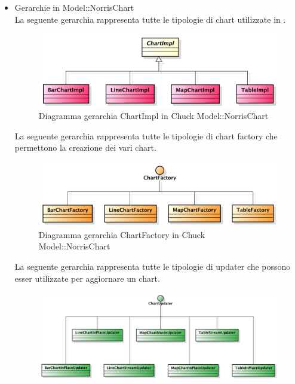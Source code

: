             \begin{itemize}
                \item Gerarchie in Model::NorrisChart \\
                    La seguente gerarchia rappresenta tutte le tipologie di chart utilizzate in .
                    \begin{figure}[H]
                        \centering
                        \includegraphics[width=1\textwidth]{DefinizioneDiProdotto/Pics/Gerarchie/ModelChartImpl.pdf}
                        \caption{Diagramma gerarchia ChartImpl in Chuck Model::NorrisChart }
                    \end{figure}
                    La seguente gerarchia rappresenta tutte le tipologie di chart factory che permettono la creazione dei vari chart.
                    \begin{figure}[H]
                        \centering
                        \includegraphics[width=1\textwidth]{DefinizioneDiProdotto/Pics/Gerarchie/ModelFactory.pdf}
                        \caption{Diagramma gerarchia ChartFactory in Chuck Model::NorrisChart}
                    \end{figure}
                    La seguente gerarchia rappresenta tutte le tipologie di updater che possono esser utilizzate per aggiornare un chart.
                    \begin{figure}[H]
                        \centering
                        \includegraphics[width=1\textwidth]{DefinizioneDiProdotto/Pics/Gerarchie/ModelUpdater.pdf}

\end{figure}
\end{itemize}
